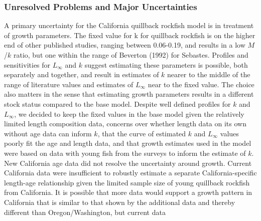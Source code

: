 \documentclass[11pt,
  english,
  letterpaper,
]{article}
\begin{document}
\hypertarget{unresolved-problems-and-major-uncertainties}{%
\subsubsection{Unresolved Problems and Major Uncertainties}\label{unresolved-problems-and-major-uncertainties}}

\leavevmode\tagmcend\tagstructend


A primary uncertainty for the California quillback rockfish model is in treatment of growth parameters. The fixed value for k for quillback rockfish is on the higher end of other published studies, ranging between 0.06-0.19, and results in a low {\(M\)\leavevmode\tagmcend\tagstructend}/{\(k\)\leavevmode\tagmcend\tagstructend} ratio, but one within the range of Beverton {(1992)\leavevmode\tagmcend\tagstructend} for Sebastes. Profiles and sensitivities for {\(L_{\infty}\)\leavevmode\tagmcend\tagstructend} and {\(k\)\leavevmode\tagmcend\tagstructend} suggest estimating these parameters is possible, both separately and together, and result in estimates of {\(k\)\leavevmode\tagmcend\tagstructend} nearer to the middle of the range of literature values and estimates of {\(L_{\infty}\)\leavevmode\tagmcend\tagstructend} near to the fixed value. The choice also matters in the sense that estimating growth parameters results in a different stock status compared to the base model. Despite well defined profiles for {\(k\)\leavevmode\tagmcend\tagstructend} and {\(L_{\infty}\)\leavevmode\tagmcend\tagstructend}, we decided to keep the fixed values in the base model given the relatively limited length composition data, concerns over whether length data on its own without age data can inform {\(k\)\leavevmode\tagmcend\tagstructend}, that the curve of estimated {\(k\)\leavevmode\tagmcend\tagstructend} and {\(L_{\infty}\)\leavevmode\tagmcend\tagstructend} values poorly fit the age and length data, and that growth estimates used in the model were based on data with young fish from the surveys to inform the estimate of {\(k\)\leavevmode\tagmcend\tagstructend}. New California age data did not resolve the uncertainty around growth. Current California data were insufficient to robustly estimate a separate California-specific length-age relationship given the limited sample size of young quillback rockfish from California. It is possible that more data would support a growth pattern in California that is similar to that shown by the additional data and thereby different than Oregon/Washington, but current data 
\end{document}
